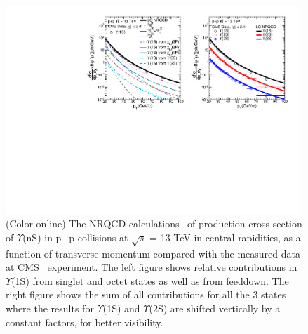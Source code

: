 \begin{figure}
  \centering
  \includegraphics[width=0.99\textwidth]{Figures/Fig3_CMS_YnS_Rap12_13TeV_Pt.pdf}
  \caption{\small{(Color online) The NRQCD calculations~\cite{Kumar:2021sek} of production cross-section of $\Upsilon$(nS)
      in p+p collisions at $\sqrt{s}$ = 13 TeV in central rapidities, as a function of
      transverse momentum compared with the measured data at CMS~\cite{CMS:2017dju}
      experiment. The left figure shows relative contributions in $\Upsilon$(1S) from
      singlet and octet states as well as from feeddown. The right figure shows the sum
      of all contributions for all the 3 states where the results for $\Upsilon$(1S) and
      $\Upsilon$(2S) are shifted vertically by a constant factors,
      for better visibility. } }
  \label{Fig:SigmaYnSCMS13TeV}
\end{figure}



